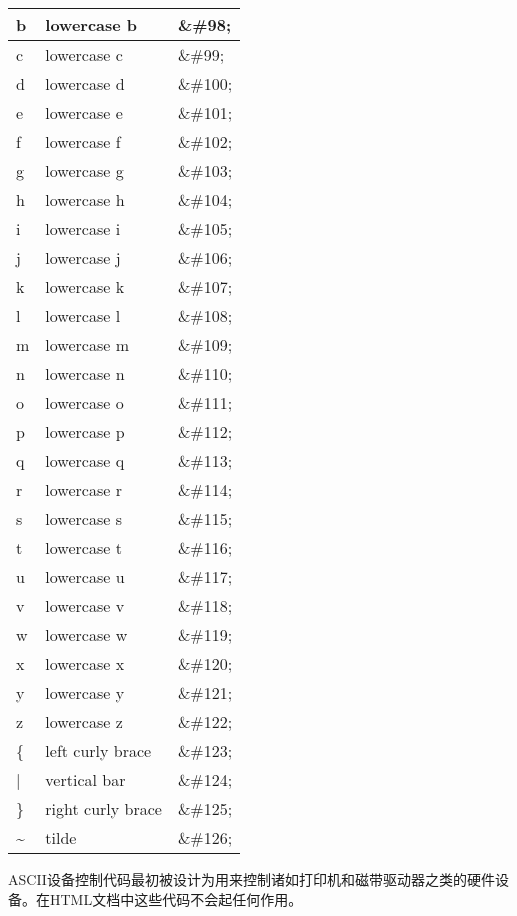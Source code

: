 \begin{longtable}{|l|l|l|}
\hline
b	&lowercase b			&\&\#98;\\
\hline
c	&lowercase c			&\&\#99;\\
\hline
d	&lowercase d			&\&\#100;\\
\hline
e	&lowercase e			&\&\#101;\\
\hline
f	&lowercase f			&\&\#102;\\
\hline
g	&lowercase g			&\&\#103;\\
\hline
h	&lowercase h			&\&\#104;\\
\hline
i	&lowercase i			&\&\#105;\\
\hline
j	&lowercase j			&\&\#106;\\
\hline
k	&lowercase k			&\&\#107;\\
\hline
l	&lowercase l			&\&\#108;\\
\hline
m	&lowercase m			&\&\#109;\\
\hline
n	&lowercase n			&\&\#110;\\
\hline
o	&lowercase o			&\&\#111;\\
\hline
p	&lowercase p			&\&\#112;\\
\hline
q	&lowercase q			&\&\#113;\\
\hline
r	&lowercase r			&\&\#114;\\
\hline
s	&lowercase s			&\&\#115;\\
\hline
t	&lowercase t			&\&\#116;\\
\hline
u	&lowercase u			&\&\#117;\\
\hline
v	&lowercase v			&\&\#118;\\
\hline
w	&lowercase w			&\&\#119;\\
\hline
x	&lowercase x			&\&\#120;\\
\hline
y	&lowercase y			&\&\#121;\\
\hline
z	&lowercase z			&\&\#122;\\
\hline
\{	&left curly brace		&\&\#123;\\
\hline
|	&vertical bar			&\&\#124;\\
\hline
\}	&right curly brace		&\&\#125;\\
\hline
\~{}	&tilde				&\&\#126;\\
\hline
\end{longtable}

ASCII设备控制代码最初被设计为用来控制诸如打印机和磁带驱动器之类的硬件设备。在HTML文档中这些代码不会起任何作用。


